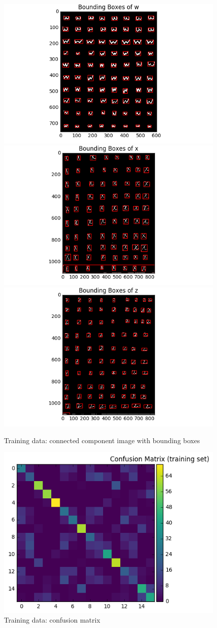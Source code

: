 \documentclass{extarticle}
\theoremstyle{definition}
\theoremstyle{definition}
\begin{document}
\begin{figure}[H]
	\includegraphics[width = 0.32\linewidth]{./figures/training_images_w_improve0.png}
	\includegraphics[width = 0.32\linewidth]{./figures/training_images_x_improve0.png}
	\includegraphics[width = 0.32\linewidth]{./figures/training_images_z_improve0.png}
	\caption{Training data: connected component image with bounding boxes}
	\label{figure1}
\end{figure}
\begin{figure}[H]
	\begin{center}
		\includegraphics[width = 0.5\linewidth]{./figures/Training_confusion_matrix_imrpovement0.png}
	\end{center}
	\caption{Training data: confusion matrix}
	\label{figure2}
\end{figure}
\end{document}
